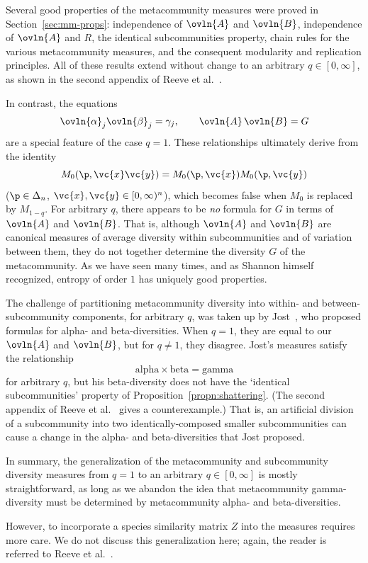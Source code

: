 Several good properties of the metacommunity measures were proved in
Section~\ref{sec:mm-props}: independence of $\ovln{A}$ and $\ovln{B}$,
independence of $\ovln{A}$ and $R$, the identical subcommunities property,
chain rules for the various
metacommunity measures, and the consequent modularity and replication
principles.  All of these results extend without change to an arbitrary $q
\in [0, \infty]$, as shown in the second appendix of Reeve et
al.~\cite{HPD}.

In contrast, the equations
\[
\index{partitioning of diversity}
\index{diversity!partitioning of}
\ovln{\alpha}_j \ovln{\beta}_j = \gamma_j,
\qquad
\ovln{A} \, \ovln{B} = G
\]
are a special feature of the case $q = 1$.  These relationships ultimately
derive from the identity
\[
M_0(\p, \vc{x}\vc{y})
=
M_0(\p, \vc{x}) M_0(\p, \vc{y})
\]
($\p \in \Delta_n$, $\vc{x}, \vc{y} \in [0, \infty)^n$), which becomes
  false when $M_0$ is replaced by $M_{1 - q}$.  For arbitrary $q$, there
  appears to be \emph{no} formula for $G$ in terms of $\ovln{A}$ and
  $\ovln{B}$.  That is, although $\ovln{A}$ and $\ovln{B}$ are canonical
  measures of average diversity within subcommunities and of variation
  between them, they do not together determine the diversity $G$ of the
  metacommunity.  As we have seen many times, and as Shannon%
%
% 
himself recognized, entropy of order $1$ has uniquely good properties.

The challenge of partitioning metacommunity diversity into 
within- and between-subcommunity components, for arbitrary $q$, was 
taken up by Jost~\cite{JostPDI,JostIAB},%
%
% 
who proposed formulas for alpha- and beta-diversities.  When $q = 1$, they
are equal to our $\ovln{A}$ and $\ovln{B}$, but for $q \neq 1$, they
disagree.  Jost's measures satisfy the relationship
\[
\text{alpha} \times \text{beta} = \text{gamma}
\]
for arbitrary $q$, but his beta-diversity does not have the `identical%
%
%
% 
subcommunities' property of Proposition~\ref{propn:shattering}.  (The
second appendix of Reeve et al.~\cite{HPD} gives a counterexample.)  That
is, an artificial division of a subcommunity into two identically-composed
smaller subcommunities can cause a change in the alpha- and
beta-diversities that Jost proposed.

In summary, the generalization of the metacommunity and subcommunity
diversity measures from $q = 1$ to an arbitrary $q \in [0, \infty]$ is
mostly straightforward, as long as we abandon the idea that metacommunity
gamma-diversity must be determined by metacommunity alpha- and
beta-diversities.

However, to incorporate a species similarity matrix $Z$ into the measures
requires more care.  We do not discuss this generalization here; again, the
reader is referred to Reeve et al.~\cite{HPD}.%
%

